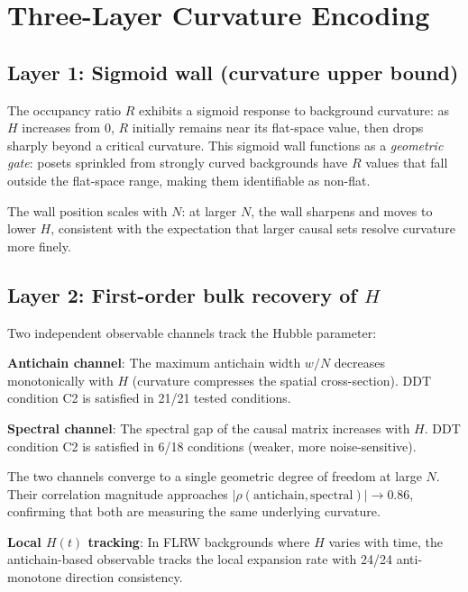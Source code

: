 \documentclass[12pt,a4paper]{article}
\begin{document}
\section{Three-Layer Curvature Encoding}

\subsection{Layer 1: Sigmoid wall (curvature upper bound)}

The occupancy ratio $R$ exhibits a sigmoid response to background curvature:
as $H$ increases from 0, $R$ initially remains near its flat-space value, then
drops sharply beyond a critical curvature.
This sigmoid wall functions as a \emph{geometric gate}: posets sprinkled from
strongly curved backgrounds have $R$ values that fall outside the flat-space
range, making them identifiable as non-flat.

The wall position scales with $N$: at larger $N$, the wall sharpens and moves
to lower $H$, consistent with the expectation that larger causal sets resolve
curvature more finely.

\subsection{Layer 2: First-order bulk recovery of \texorpdfstring{$H$}{H}}

Two independent observable channels track the Hubble parameter:

\textbf{Antichain channel}: The maximum antichain width $w/N$ decreases
monotonically with $H$ (curvature compresses the spatial cross-section).
DDT condition C2 is satisfied in 21/21 tested conditions.

\textbf{Spectral channel}: The spectral gap of the causal matrix increases
with $H$.
DDT condition C2 is satisfied in 6/18 conditions (weaker, more noise-sensitive).

The two channels converge to a single geometric degree of freedom at large $N$.
Their correlation magnitude approaches
$|\rho(\text{antichain}, \text{spectral})|\to 0.86$,
confirming that both are measuring the same underlying curvature.

\textbf{Local $H(t)$ tracking}: In FLRW backgrounds where $H$ varies with time,
the antichain-based observable tracks the local expansion rate with 24/24
anti-monotone direction consistency.
\end{document}
